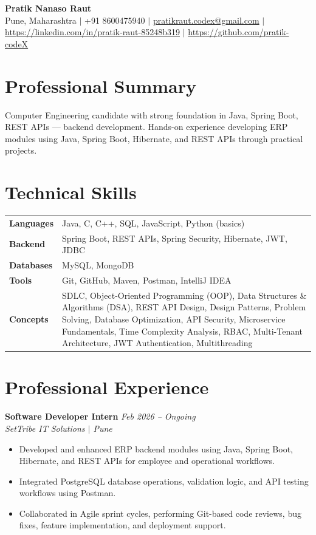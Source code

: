 \documentclass[10.5pt,a4paper]{article}
\begin{document}
\begin{center}
{\Large\bfseries Pratik Nanaso Raut}\\[2pt]
Pune, Maharashtra $|$ +91 8600475940 $|$ \href{mailto:pratikraut.codex@gmail.com}{pratikraut.codex@gmail.com} $|$ \href{https://linkedin.com/in/pratik-raut-85248b319}{https://linkedin.com/in/pratik-raut-85248b319} $|$ \href{https://github.com/pratik-codeX}{https://github.com/pratik-codeX}
\end{center}
\vspace{-2pt}
\section{Professional Summary}
Computer Engineering candidate with strong foundation in Java, Spring Boot, REST APIs — backend development. Hands-on experience developing ERP modules using Java, Spring Boot, Hibernate, and REST APIs through practical projects.
\section{Technical Skills}
\begin{tabular}{@{}p{}p{}@{}}
\textbf{Languages} & Java, C, C++, SQL, JavaScript, Python (basics) \\[1pt]
\textbf{Backend} & Spring Boot, REST APIs, Spring Security, Hibernate, JWT, JDBC \\[1pt]
\textbf{Databases} & MySQL, MongoDB \\[1pt]
\textbf{Tools} & Git, GitHub, Maven, Postman, IntelliJ IDEA \\[1pt]
\textbf{Concepts} & SDLC, Object-Oriented Programming (OOP), Data Structures \& Algorithms (DSA), REST API Design, Design Patterns, Problem Solving, Database Optimization, API Security, Microservice Fundamentals, Time Complexity Analysis, RBAC, Multi-Tenant Architecture, JWT Authentication, Multithreading \\
\end{tabular}
\section{Professional Experience}
\textbf{Software Developer Intern} \hfill \textit{Feb 2026 -- Ongoing}
\\\textit{SetTribe IT Solutions $|$ Pune}
\begin{itemize}
  \item Developed and enhanced ERP backend modules using Java, Spring Boot, Hibernate, and REST APIs for employee and operational workflows.
  \item Integrated PostgreSQL database operations, validation logic, and API testing workflows using Postman.
  \item Collaborated in Agile sprint cycles, performing Git-based code reviews, bug fixes, feature implementation, and deployment support.
\end{itemize}
\end{document}

